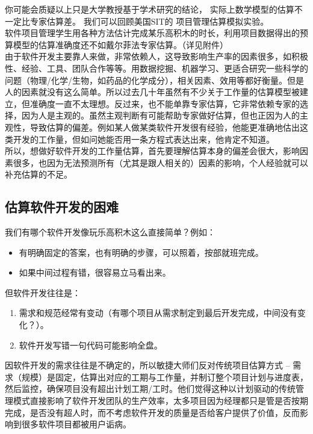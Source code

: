 你可能会质疑以上只是大学教授基于学术研究的结论，
实际上数学模型的估算不一定比专家估算差。 我们可以回顾美国SIT的
项目管理估算模拟实验。\\
软件项目管理学生用各种方法估计完成某乐高积木的时长，利用项目数据得出的预算模型的估算准确度还不如戴尔菲法专家估算。（详见附件）\\
由于软件开发主要靠人来做，非常依赖人，这导致影响生产率的因素很多，如积极性、经验、工具、团队合作等等。用数据挖掘、机器学习、更适合研究一些科学的问题（物理/化学/生物，如药品的化学成分），相关因素、效用等都好衡量。但是人的因素就没有这么简单。所以过去几十年虽然有不少关于工作量的估算模型被建立，但准确度一直不太理想。反过来，也不能单靠专家估算，它非常依赖专家的选择，因为人是主观的。虽然主观判断有可能帮助专家做好估算，但也正因为人的主观性，导致估算的偏差。例如某人做某类软件开发很有经验，他能更准确地估出这类开发的工作量，但如问她能否用一条方程式表达出来，他肯定不知道。\\
所以，想做好软件开发的工作量估算，首先要理解估算本身的偏差会很大，影响因素很多，也因为无法预测所有（尤其是跟人相关的）因素的影响，个人经验就可以补充估算的不足。\\

\hypertarget{ux4f30ux7b97ux8f6fux4ef6ux5f00ux53d1ux7684ux56f0ux96be}{%
\subsection{估算软件开发的困难}\label{ux4f30ux7b97ux8f6fux4ef6ux5f00ux53d1ux7684ux56f0ux96be}}

我们有哪个软件开发像玩乐高积木这么直接简单？例如：

\begin{itemize}
\tightlist
\item
  有明确固定的答案，也有明确的步骤，可以照着，按部就班完成。
\item
  如果中间过程有错，很容易立马看出来。
\end{itemize}

但软件开发往往是：

\begin{enumerate}
\tightlist
\item
  需求和规范经常有变动（有哪个项目从需求制定到最后开发完成，中间没有变化？）。
\item
  软件开发写错一句代码可能影响全盘。
\end{enumerate}

因软件开发的需求往往是不确定的，所以敏捷大师们反对传统项目估算方式 --
需求（规模）是固定，估算出对应的工期与工作量，并制订整个项目计划与进度表，然后监控，确保项目没有超出计划工期/工时。他们觉得这种以计划驱动的传统管理模式直接影响了软件开发团队的生产效率，太多项目因为经理都只是管是否按期完成，是否没有超人时，而不考虑软件开发的质量是否给客户提供了价值，反而影响到很多软件项目都被用户诟病。

